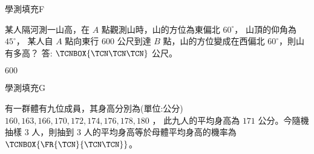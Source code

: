\begin{QUESTIONS}
\begin{QUESTION}
        \begin{QSOLLIST}
        \end{QSOLLIST}
        \begin{QEMPTYSPACE}
        \end{QEMPTYSPACE}
    \end{QUESTION}
    \begin{QUESTION}
        \begin{ExamInfo}{91}{學測}{填充}{F}
        \end{ExamInfo}
        \begin{ExamAnsRateInfo}{51}{89}{50}{14}
        \end{ExamAnsRateInfo}
        \begin{QBODY}
            某人隔河測一山高，在 $A$ 點觀測山時，山的方位為東偏北 $60^\circ$，
            山頂的仰角為 $45^\circ$，
            某人自 $A$ 點向東行 $600$ 公尺到達 $B$ 點，山的方位變成在西偏北 $60^\circ$，則山有多高？ 答: $
            \TCNBOX{\TCN\TCN\TCN}$ 公尺。
        \end{QBODY}
        \begin{QFROMS}
        \end{QFROMS}
        \begin{QTAGS}\end{QTAGS}
        \begin{QANS}
            $600$
        \end{QANS}
        \begin{QSOLLIST}
        \end{QSOLLIST}
        \begin{QEMPTYSPACE}
        \end{QEMPTYSPACE}
    \end{QUESTION}
    \begin{QUESTION}
        \begin{ExamInfo}{91}{學測}{填充}{G}
        \end{ExamInfo}
        \begin{ExamAnsRateInfo}{29}{58}{24}{5}
        \end{ExamAnsRateInfo}
        \begin{QBODY}
            有一群體有九位成員，其身高分別為(單位:公分) $160, 163, 166, 170, 172, 174, 176, 178, 180$ ， 此九人的平均身高為 $171$ 公分。今隨機抽樣 $3$ 人，則抽到 $3$ 人的平均身高等於母體平均身高的機率為 
            $\TCNBOX{\FR{\TCN}{\TCN\TCN}} $。
        \end{QBODY}
        \begin{QFROMS}

\end{QFROMS}
\end{QUESTION}
\end{QUESTIONS}
